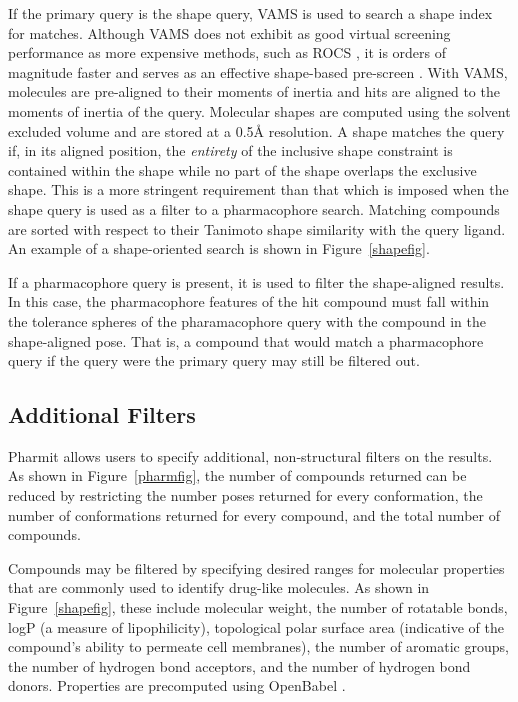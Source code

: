 If the primary query is the shape query, VAMS \cite{vams} is used to search a shape index \cite{matchpack} for matches.  Although VAMS does not exhibit as good virtual screening performance as more expensive methods, such as ROCS \cite{Hawkins_2007}, it is orders of magnitude faster and serves as an effective shape-based pre-screen \cite{vams}.
With VAMS, molecules are pre-aligned to their moments of inertia and hits are aligned to the moments of inertia of the query.  Molecular shapes are computed using the solvent excluded volume and are stored at a 0.5{\AA} resolution. A shape matches the query if, in its aligned position, the \textit{entirety} of the inclusive shape constraint is contained within the shape while no part of the shape overlaps the exclusive shape.  This is a more stringent requirement than that which is imposed when the shape query is used as a filter to a pharmacophore search.
Matching compounds are sorted with respect to their Tanimoto shape similarity with the query ligand. An example of a shape-oriented search is shown in Figure~\ref{shapefig}.

If a pharmacophore query is present, it is used to filter the shape-aligned results. In this case, the pharmacophore features of the hit compound must fall within the tolerance spheres of the pharamacophore query with the compound in the shape-aligned pose. That is, a compound that would match a pharmacophore query if the query were the primary query may still be filtered out.
 
\subsection{Additional Filters}
Pharmit allows users to specify additional, non-structural filters on the results. As shown in Figure~\ref{pharmfig}, the number of compounds returned can be reduced by restricting the number poses returned for every conformation, the number of conformations returned for every compound, and the total number of compounds.

Compounds may be filtered by specifying desired ranges for molecular properties that are commonly used to identify drug-like molecules.
As shown in Figure~\ref{shapefig}, these include molecular weight, the number of rotatable bonds, logP (a measure of lipophilicity), topological polar surface area (indicative of the compound's ability to permeate cell membranes), the number of aromatic groups, the number of hydrogen bond acceptors, and the number of hydrogen bond donors.  Properties are precomputed using OpenBabel \cite{O_Boyle_2011}.

